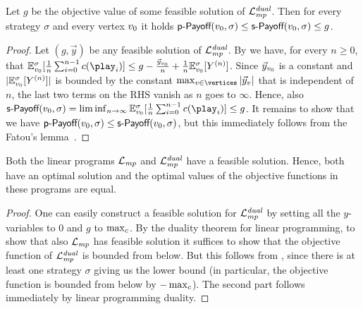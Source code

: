 \begin{corollary}
\label{5-cor:mp-value-bound}
Let $g$ be the objective value of some feasible solution of $\mathcal{L}_{\mathit{mp}}^{\mathit{dual}}$. Then for every strategy $\sigma$ and every vertex $v_0$ it holds $\textsf{p-Payoff}(v_0,\sigma) \leq \textsf{s-Payoff}(v_0,\sigma) \leq g$.
\end{corollary}
\begin{proof}
Let $ ({g}, \vec{y})$ be any feasible solution of $\mathcal{L}_{\mathit{mp}}^{\mathit{dual}}$.
By  we have, for every $n\geq 0$, that $\expv^\sigma_{\vinit}[\frac{1}{n}\sum_{i=0}^{n-1}\colouring(\play_i)]\leq g - \frac{ \vec{y}_{\vinit}}{n}+ \frac{1}{n}\expv^\sigma_{\vinit} [Y^{(n)}]$. Since $ \vec{y}_{v_0}$ is a constant and $|\mathbb{E}^\sigma_{v_0} [Y^{(n)}]|$ is bounded by the constant $ \max_{v\in \vertices}|\vec{y}_v|$ that is independent of $n$, the last two terms on the RHS vanish as $n$ goes to $\infty$. Hence, also $\stepPay(\vinit,\sigma) = \liminf_{n\rightarrow \infty} \expv^\sigma_{\vinit}[\frac{1}{n}\sum_{i=0}^{n-1}\colouring(\play_i)] \leq g$. It remains to show that we have $\textsf{p-Payoff}(v_0,\sigma) \leq \textsf{s-Payoff}(v_0,\sigma)$, but this immediately follows from the Fatou's lemma~\cite[Theorem 1.6.8]{Ash&Doleans-Dade:2000}.
\end{proof}

\begin{corollary}
\label{5-cor:lpmp-optimal-exists}
Both the linear programs $\mathcal{L}_{\mathit{mp}}$ and $\mathcal{L}_{\mathit{mp}}^{\mathit{dual}}$ have a feasible solution. Hence, both have an optimal solution and the optimal values of the objective functions in these programs are equal.
\end{corollary}
\begin{proof}
One can easily construct a feasible solution for $\mathcal{L}_{\mathit{mp}}^{\mathit{dual}}$ by setting all the $y$-variables to $0$ and $g$ to $\max_{c}$. By the duality theorem for linear programming, to show that also $\mathcal{L}_{\mathit{mp}}$ has feasible solution it suffices to show that the objective function of $\mathcal{L}_{\mathit{mp}}^{\mathit{dual}}$ is bounded from below. But this follows from , since there is at least one strategy $\sigma$ giving us the lower bound (in particular, the objective function is bounded from below by $-\max_{c}$). The second part follows immediately by linear programming duality.
\end{proof}




